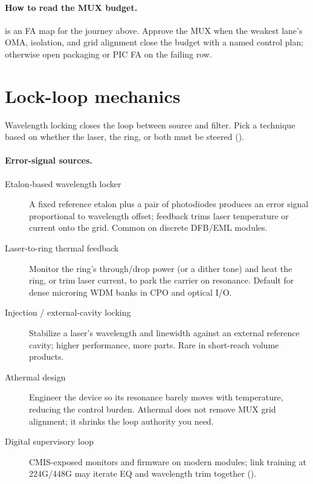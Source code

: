 \paragraph{How to read the MUX budget.}
 is an FA map for the journey above. Approve the MUX when
the weakest lane's OMA, isolation, and grid alignment close the budget with a
named control plan; otherwise open packaging or PIC FA on the failing row.

\section{Lock-loop mechanics}
\label{sec:locking-techniques}

Wavelength locking closes the loop between source and filter. Pick a technique
based on whether the laser, the ring, or both must be steered
().

\paragraph{Error-signal sources.}
\begin{description}
\item[Etalon-based wavelength locker]
      A fixed reference etalon plus a pair of photodiodes produces an error signal
      proportional to wavelength offset; feedback trims laser temperature or current
      onto the grid. Common on discrete DFB/EML modules.
\item[Laser-to-ring thermal feedback]
      Monitor the ring's through/drop power (or a dither tone) and heat the ring, or
      trim laser current, to park the carrier on resonance. Default for dense
      microring WDM banks in CPO and optical I/O.
\item[Injection / external-cavity locking]
      Stabilize a laser's wavelength and linewidth against an external reference
      cavity; higher performance, more parts. Rare in short-reach volume products.
\item[Athermal design]
      Engineer the device so its resonance barely moves with temperature, reducing
      the control burden. Athermal does not remove MUX grid alignment; it shrinks
      the loop authority you need.
\item[Digital supervisory loop]
      CMIS-exposed monitors and firmware on modern modules; link training at
      224G/448G may iterate EQ and wavelength trim together
      ().
\end{description}


